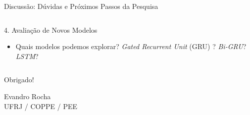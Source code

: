 \documentclass[aspectratio=169]{beamer}
\begin{document}
\begin{frame}{Discuss\~{a}o: D\'{u}vidas e Pr\'{o}ximos Passos da Pesquisa}
\begin{columns}[t]
        \vspace{0.02cm}
        \begin{block}{\small 4. Avalia\c{c}\~{a}o de Novos Modelos}
            \scriptsize
            \begin{itemize}
                \setlength{\itemsep}{0pt}
                \item Quais modelos podemos explorar?  \textit{Gated Recurrent Unit} (GRU) ? \textit{Bi-GRU}? \textit{LSTM}? 
            \end{itemize}
        \end{block}
    \end{columns}
\end{frame}

\begin{frame}
    \centering
    \Huge Obrigado!
    
    \vspace{0.5cm}
    \large
    
    
    \vspace{0.3cm}
    \normalsize
    Evandro Rocha\\
    UFRJ / COPPE / PEE
\end{frame}
\end{document}
